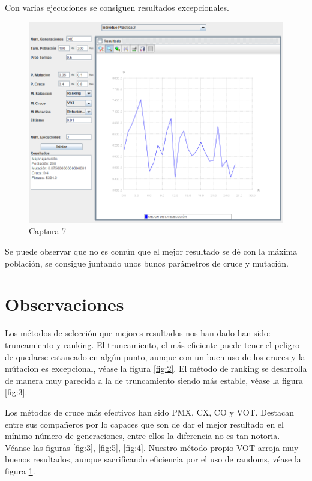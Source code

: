\documentclass[twoside]{AiTeX}
\begin{document}
Con varias ejecuciones se consiguen resultados excepcionales.

\begin{figure}[H]
    \centering
    \includegraphics[width = \textwidth]{Images/Captura7.png}
    \caption{Captura 7}
    \label{fig:7}
\end{figure}

Se puede observar que no es común que el mejor resultado se dé con la máxima población, se consigue juntando unos bunos parámetros de cruce y mutación.


\section{Observaciones}

Los métodos de selección que mejores resultados nos han dado han sido: truncamiento y ranking. El truncamiento, el más eficiente puede tener el peligro de quedarse estancado en algún punto, aunque con un buen uso de los cruces y la mútacion es excepcional, véase la figura \ref{fig:2}.
El método de ranking se desarrolla de manera muy parecida a la de truncamiento siendo más estable, véase la figura \ref{fig:3}.

Los métodos de cruce más efectivos han sido PMX, CX, CO y VOT. Destacan entre sus compañeros por lo capaces que son de dar el mejor resultado en el mínimo número de generaciones, entre ellos la diferencia no es tan notoria. Véanse las figuras \ref{fig:3}, \ref{fig:5}, \ref{fig:4}.
Nuestro método propio VOT arroja muy buenos resultados, aunque sacrificando eficiencia por el uso de randoms, véase la figura \ref{fig:7}.
\end{document}
